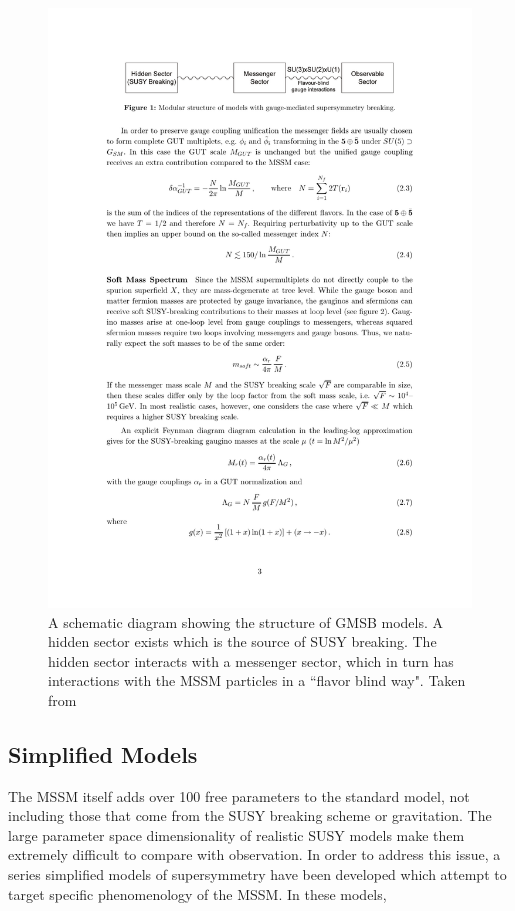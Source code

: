     \begin{figure}[h!]
      \centering
      \includegraphics[width=\textwidth]{figures/gmsb.pdf}
      \caption{A schematic diagram showing the structure of GMSB models. A hidden sector exists which is the source of SUSY breaking. The hidden sector interacts with a messenger sector, which in turn has interactions with the MSSM particles in a ``flavor blind way". Taken from \cite{gmsb}}
      \label{fig:gmsb}
    \end{figure}

  \subsection{Simplified Models}
    The MSSM itself adds over 100 free parameters to the standard model, not including those that come from the SUSY breaking scheme or gravitation. The large parameter space dimensionality of realistic SUSY models make them extremely difficult to compare with observation. In order to address this issue, a series simplified models of supersymmetry have been developed which attempt to target specific phenomenology of the MSSM. In these models, 

